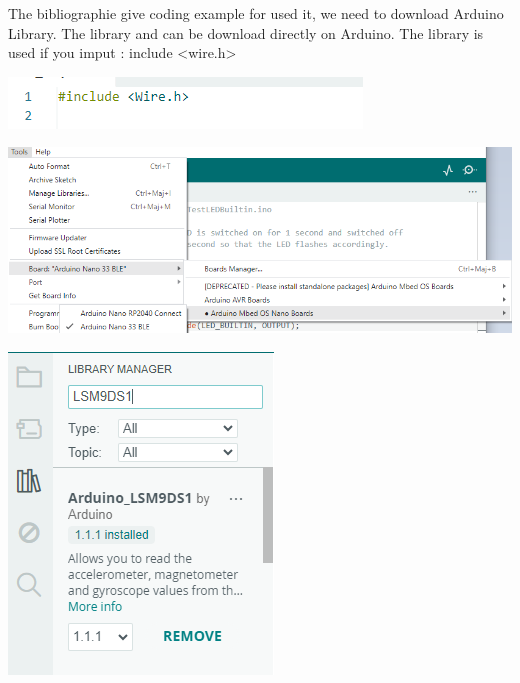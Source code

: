 The bibliographie give coding example for used it, we need to download Arduino Library.  The library  and  can be download directly on Arduino. The library  is used if you imput :  include <wire.h>

	\begin{center}
		\includegraphics[width=0.7\linewidth]{Images/ArduinoIDE/wire.png}
	\end{center}



	\begin{center}
		\includegraphics[width=0.7\linewidth]{Images/ArduinoIDE/LSM6DSboard.png}
	\end{center}


	\begin{center}	
		\includegraphics[width=0.7\linewidth]{Images/ArduinoIDE/LSM9DS1.png}
	\end{center}


